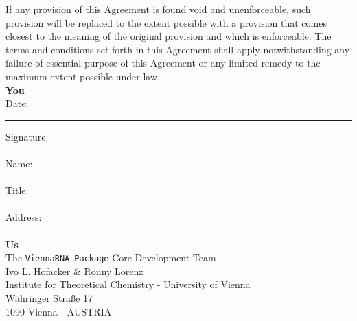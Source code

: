 \documentclass{article}
\begin{document}
If any provision of this Agreement is found void and unenforceable, such
provision will be replaced to the extent possible with a provision that comes
closest to the meaning of the original provision and which is enforceable. The
terms and conditions set forth in this Agreement shall apply notwithstanding any
failure of essential purpose of this Agreement or any limited remedy to the
maximum extent possible under law.\\

\vspace{1.5cm}
\noindent\textbf{You}\\
Date: \rule{0.2\textwidth}{0.5pt} Signature: \hrulefill \\\\
Name: \hrulefill\\\\
Title: \hrulefill\\\\
Address: \hrulefill\\
\hrulefill\\

\vspace{1cm}
\noindent\textbf{Us}\\
The \texttt{ViennaRNA Package} Core Development Team\\
Ivo L. Hofacker \& Ronny Lorenz\\
Institute for Theoretical Chemistry - University of Vienna\\
W{\"a}hringer Stra{\ss}e 17\\
1090 Vienna - AUSTRIA
\end{document}
